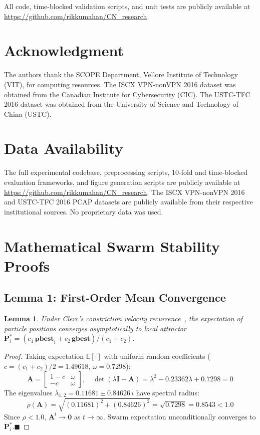 \documentclass[journal]{IEEEtran}
\newtheorem{lemma}{Lemma}
\begin{document}
All code, time-blocked validation scripts, and unit tests are publicly
available at \url{https://github.com/rikkumahan/CN_research}.

\section*{Acknowledgment}
The authors thank the SCOPE Department, Vellore Institute of Technology (VIT),
for computing resources. The ISCX VPN-nonVPN 2016 dataset was obtained from the
Canadian Institute for Cybersecurity (CIC). The USTC-TFC 2016 dataset was
obtained from the University of Science and Technology of China (USTC).

\section*{Data Availability}
The full experimental codebase, preprocessing scripts, 10-fold and time-blocked
evaluation frameworks, and figure generation scripts are publicly available at
\url{https://github.com/rikkumahan/CN_research}. The ISCX VPN-nonVPN 2016 and
USTC-TFC 2016 PCAP datasets are publicly available from their respective
institutional sources. No proprietary data was used.

\appendix
\section{Mathematical Swarm Stability Proofs}
\label{app:proofs}

\subsection{Lemma 1: First-Order Mean Convergence}
\begin{lemma}
Under Clerc's constriction velocity recurrence~\cite{clerc2002}, the expectation
of particle positions converges asymptotically to local attractor
$\mathbf{P}_i^* = (c_1\,\mathbf{pbest}_i + c_2\,\mathbf{gbest})/(c_1+c_2)$.
\end{lemma}
\begin{proof}
Taking expectation $\mathbb{E}[\cdot]$ with uniform random coefficients
($c=(c_1+c_2)/2=1.49618$, $\omega=0.7298$):
\begin{equation}
  \mathbf{A} = \begin{bmatrix}1-c & \omega\\ -c & \omega\end{bmatrix},
  \quad
  \det(\lambda\mathbf{I}-\mathbf{A}) = \lambda^2 - 0.23362\lambda + 0.7298 = 0
\end{equation}
The eigenvalues $\lambda_{1,2} = 0.11681 \pm 0.84626\,i$ have spectral radius:
\begin{equation}
  \rho(\mathbf{A}) = \sqrt{(0.11681)^2 + (0.84626)^2} = \sqrt{0.7298}
  = \mathbf{0.8543} < 1.0
\end{equation}
Since $\rho<1.0$, $\mathbf{A}^t\to\mathbf{0}$ as $t\to\infty$. Swarm
expectation unconditionally converges to $\mathbf{P}_i^*$.\hfill$\blacksquare$
\end{proof}
\end{document}
